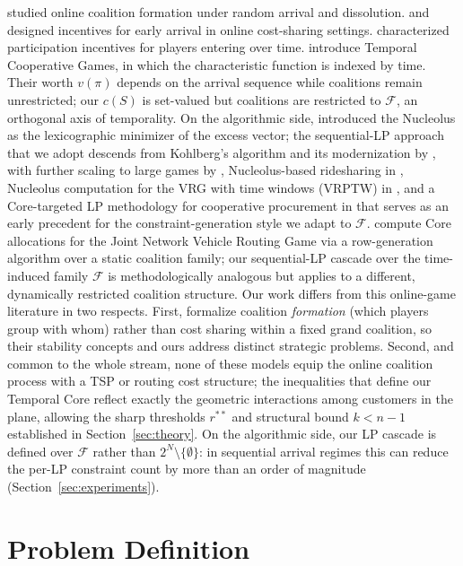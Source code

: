 \documentclass[11pt]{article}
\theoremstyle{plain}
\theoremstyle{definition}
\theoremstyle{remark}
\newcommand{\F}{\mathcal{F}}
\begin{document}
\citet{bullinger2023online} studied online coalition formation under random arrival and dissolution. \citet{ge2024incentives} and \citet{zhang2025incentives} designed incentives for early arrival in online cost-sharing settings. \citet{aziz2025participation} characterized participation incentives for players entering over time. \citet{goyal2025temporal} introduce Temporal Cooperative Games, in which the characteristic function is indexed by time. Their worth $v(\pi)$ depends on the arrival sequence while coalitions remain unrestricted; our $c(S)$ is set-valued but coalitions are restricted to $\mathcal{F}$, an orthogonal axis of temporality. On the algorithmic side, \citet{schmeidler1969nucleolus} introduced the Nucleolus as the lexicographic minimizer of the excess vector; the sequential-LP approach that we adopt descends from Kohlberg's algorithm and its modernization by \citet{guajardo2015nucleolus}, with further scaling to large games by \citet{nguyen2016large}, Nucleolus-based ridesharing in \citet{lu2019ridesharing}, Nucleolus computation for the VRG with time windows (VRPTW) in \citet{tae2020vrgtw}, and a Core-targeted LP methodology for cooperative procurement in \citet{drechsel2010computing} that serves as an early precedent for the constraint-generation style we adapt to $\F$. \citet{vanzon2021joint} compute Core allocations for the Joint Network Vehicle Routing Game via a row-generation algorithm over a static coalition family; our sequential-LP cascade over the time-induced family $\F$ is methodologically analogous but applies to a different, dynamically restricted coalition structure. Our work differs from this online-game literature in two respects. First, \citet{bullinger2023online} formalize coalition \emph{formation} (which players group with whom) rather than cost sharing within a fixed grand coalition, so their stability concepts and ours address distinct strategic problems. Second, and common to the whole stream, none of these models equip the online coalition process with a TSP or routing cost structure; the inequalities that define our Temporal Core reflect exactly the geometric interactions among customers in the plane, allowing the sharp thresholds $r^{\ast\ast}$ and structural bound $k<n-1$ established in Section~\ref{sec:theory}. On the algorithmic side, our LP cascade is defined over $\F$ rather than $2^N\setminus\{\emptyset\}$: in sequential arrival regimes this can reduce the per-LP constraint count by more than an order of magnitude (Section~\ref{sec:experiments}).

\section{Problem Definition}
\label{sec:problem}
\end{document}
